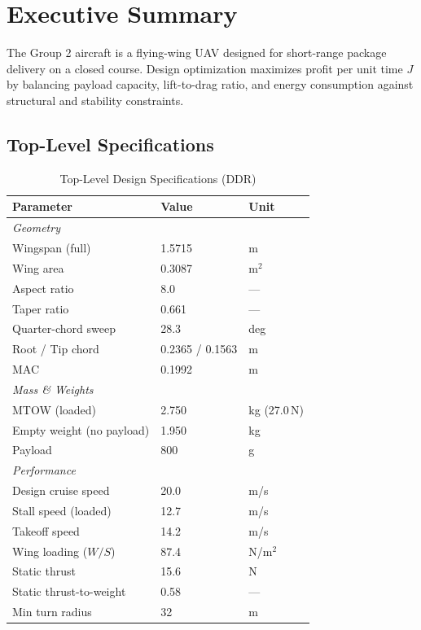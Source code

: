 \documentclass[10pt]{article}
\begin{document}
\section*{Executive Summary}

The Group 2 aircraft is a flying-wing UAV designed for short-range package delivery
on a closed course. Design optimization maximizes profit per unit time $J$ by
balancing payload capacity, lift-to-drag ratio, and energy consumption against
structural and stability constraints.

\subsection*{Top-Level Specifications}

\begin{table}[H]
\centering
\caption{Top-Level Design Specifications (DDR)}
\label{tab:specs}
\small
\begin{tabular}{lll}
\toprule
\textbf{Parameter} & \textbf{Value} & \textbf{Unit} \\
\midrule
\multicolumn{3}{l}{\textit{Geometry}} \\
Wingspan (full) & 1.5715 & m \\
Wing area & 0.3087 & m$^2$ \\
Aspect ratio & 8.0 & --- \\
Taper ratio & 0.661 & --- \\
Quarter-chord sweep & 28.3 & deg \\
Root / Tip chord & 0.2365 / 0.1563 & m \\
MAC & 0.1992 & m \\
\midrule
\multicolumn{3}{l}{\textit{Mass \& Weights}} \\
MTOW (loaded) & 2.750 & kg (27.0\,N) \\
Empty weight (no payload) & 1.950 & kg \\
Payload & 800 & g \\
\midrule
\multicolumn{3}{l}{\textit{Performance}} \\
Design cruise speed & 20.0 & m/s \\
Stall speed (loaded) & 12.7 & m/s \\
Takeoff speed & 14.2 & m/s \\
Wing loading ($W/S$) & 87.4 & N/m$^2$ \\
Static thrust & 15.6 & N \\
Static thrust-to-weight & 0.58 & --- \\
Min turn radius & 32 & m \\

\end{tabular}
\end{table}
\end{document}
